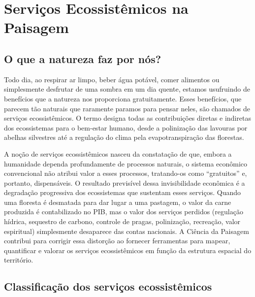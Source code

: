 \documentclass[
  portuguese,
  11pt,
  a4paper,
  open=any]{scrbook}
\begin{document}
\chapter{Serviços Ecossistêmicos na
Paisagem}\label{sec-servicos-ecossistemicos}

\section{O que a natureza faz por
nós?}\label{o-que-a-natureza-faz-por-nuxf3s}

Todo dia, ao respirar ar limpo, beber água potável, comer alimentos ou
simplesmente desfrutar de uma sombra em um dia quente, estamos
usufruindo de benefícios que a natureza nos proporciona gratuitamente.
Esses benefícios, que parecem tão naturais que raramente paramos para
pensar neles, são chamados de serviços ecossistêmicos. O termo designa
todas as contribuições diretas e indiretas dos ecossistemas para o
bem-estar humano, desde a polinização das lavouras por abelhas
silvestres até a regulação do clima pela evapotranspiração das
florestas.

A noção de serviços ecossistêmicos nasceu da constatação de que, embora
a humanidade dependa profundamente de processos naturais, o sistema
econômico convencional não atribui valor a esses processos, tratando-os
como ``gratuitos'' e, portanto, dispensáveis. O resultado previsível
dessa invisibilidade econômica é a degradação progressiva dos
ecossistemas que sustentam esses serviços. Quando uma floresta é
desmatada para dar lugar a uma pastagem, o valor da carne produzida é
contabilizado no PIB, mas o valor dos serviços perdidos (regulação
hídrica, sequestro de carbono, controle de pragas, polinização,
recreação, valor espiritual) simplesmente desaparece das contas
nacionais. A Ciência da Paisagem contribui para corrigir essa distorção
ao fornecer ferramentas para mapear, quantificar e valorar os serviços
ecossistêmicos em função da estrutura espacial do território.

\section{Classificação dos serviços
ecossistêmicos}\label{classificauxe7uxe3o-dos-serviuxe7os-ecossistuxeamicos}
\end{document}

